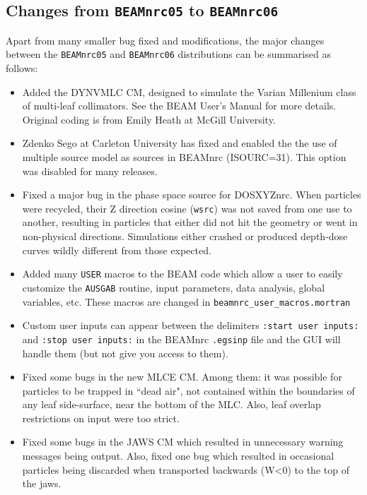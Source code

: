 \documentclass[12pt,twoside]{article}
\begin{document}
\subsection{Changes from {\tt BEAMnrc05} to {\tt BEAMnrc06}}

Apart from many smaller bug fixed and modifications,
the major changes between the {\tt BEAMnrc05} and {\tt BEAMnrc06}
distributions
can be summarised as follows:

\begin{itemize}

\item Added the DYNVMLC CM, designed to simulate the Varian Millenium
class of multi-leaf collimators.  See the BEAM User's Manual for
more details.  Original coding is from Emily Heath at
McGill University.

\item Zdenko Sego at Carleton University has fixed and enabled the
the use of multiple
source model as sources in BEAMnrc (ISOURC=31).  This option was disabled
for many releases.

\item Fixed a major bug in the phase space source for DOSXYZnrc.
When particles were recycled, their Z direction cosine ({\tt wsrc})
was not saved from one use to another, resulting in particles that
either did not hit the geometry or went in non-physical directions.
Simulations either crashed or produced depth-dose curves wildly
different from those expected.

\item Added many {\tt USER} macros to the BEAM code which allow
a user to easily customize the {\tt AUSGAB} routine,
input parameters, data analysis, global variables, etc.  These
macros are changed in {\tt beamnrc\_user\_macros.mortran}

\item Custom user inputs can appear between the delimiters
{\tt :start user inputs:} and {\tt :stop user inputs:} in the
BEAMnrc {\tt .egsinp} file and the GUI will handle them (but not
give you access to them).

\item Fixed some bugs in the new MLCE CM.  Among them: it was possible
for particles to be trapped in ``dead air", not contained within the
boundaries of any leaf side-surface, near the bottom of the MLC.  Also,
leaf overlap restrictions on input were too strict.

\item Fixed some bugs in the JAWS CM which resulted in unnecessary
warning messages being output.  Also, fixed one bug which resulted
in occasional particles being discarded when transported backwards
(W<0) to the top of the jaws.

\end{itemize}
\end{document}
